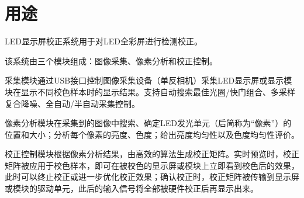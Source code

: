\section{用途}\label{usage}

LED显示屏校正系统用于对LED全彩屏进行检测校正。

该系统由三个模块组成：图像采集、像素分析和校正控制。

采集模块通过USB接口控制图像采集设备（单反相机）采集LED显示屏或显示模块在显示不同校色样本时的显示结果。支持自动搜索最佳光圈/快门组合、多采样复合降噪、全自动/半自动采集控制。

像素分析模块在采集到的图像中搜索、确定LED发光单元（后简称为“像素”）的位置和大小；分析每个像素的亮度、色度；给出亮度均匀性以及色度均匀性评价。

校正控制模块根据像素分析结果，由高效的算法生成校正矩阵。实时预览时，校正矩阵被应用于校色样本，即可在被校色的显示屏或模块上立即看到校色后的效果，此时可以终止校正或进一步优化校正效果；确认校正时，校正矩阵被传输到显示屏或模块的驱动单元，此后的输入信号将全部被硬件校正后再显示出来。

\clearpage
